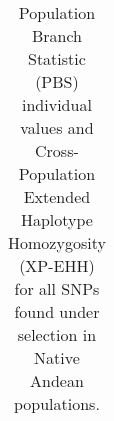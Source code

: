 \begin{table}[!htbp]
{\begin{tabular}{|l|l|l|l|l|l|r|r|r|r|}
\end{tabular}}

\caption{Population Branch Statistic (PBS) individual values and Cross-Population Extended Haplotype Homozygosity (XP-EHH) for all SNPs found under selection in Native Andean populations.}
\label{tab:SciRep_table1}

\end{table}